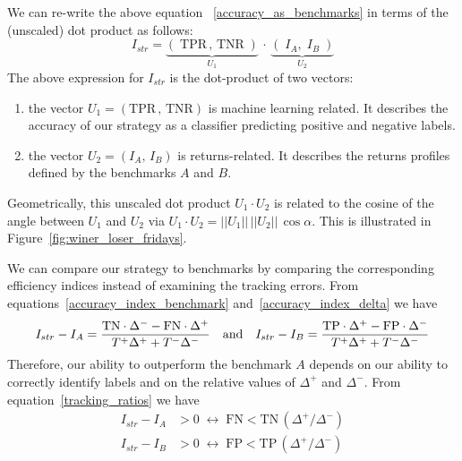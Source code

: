 \documentclass{article}
\begin{document}
We can re-write the above equation ~\eqref{accuracy_as_benchmarks} in terms of the (unscaled) dot product as 
follows:
\begin{equation}
I_{str} = \underbrace{(\; \text{TPR} \, , \, \text{TNR}\; )}_{U_{1}} \,  \cdot \, 
\underbrace{(\; I_{A},\;  I_{B}\; )}_{U_{2}}
\label{dot_product}
\end{equation}
The above expression for $I_{str}$ is the dot-product of two vectors:
\medskip
\begin{enumerate}[nosep] 
\item the vector $U_{1}=(\text{TPR}\, , \, \text{TNR})$ is machine learning related. It describes the accuracy of our strategy as a classifier predicting positive and negative labels.
\item the vector 
 $U_{2}=(I_{A},\,  I_{B})$ is returns-related. It 
 describes the returns profiles defined by the benchmarks $A$ and $B$.
 \end{enumerate}
 
Geometrically, this unscaled dot product $U_{1}\cdot U_{2}$ is related to the cosine of the angle between
$U_{1}$ and $U_{2}$ via 
$U_{1}\cdot U_{2}=\lvert\rvert U_{1}\lvert\rvert \, \lvert\rvert U_{2}\lvert\rvert\, \cos\alpha$. This is illustrated in Figure~\ref{fig:winer_loser_fridays}.

\medskip
We can compare our strategy to benchmarks by comparing the corresponding efficiency indices instead of examining the tracking errors.
From equations~\eqref{accuracy_index_benchmark} 
and~\eqref{accuracy_index_delta} we have
\begin{equation}
I_{str}-I_{A} = \frac{\text{TN}\cdot\Delta^{-}-\text{FN}\cdot\Delta^{+}}{T^{+} \Delta^{+} + T^{-}\Delta^{-}} \quad \hbox{and} \quad 
I_{str}-I_{B}  = \frac{\text{TP}\cdot\Delta^{+}-\text{FP}\cdot\Delta^{-}}{T^{+} \Delta^{+} + T^{-}\Delta^{-}} 
\label{tracking_ratios}
\end{equation}
Therefore, our ability to outperform the benchmark $A$  depends on our ability to correctly identify 
labels and on the relative values of $\Delta^{+}$ and $\Delta^{-}$. From equation~\eqref{tracking_ratios} we have
\begin{equation}
\begin{split}
I_{str}-I_{A} & > 0 \; \longleftrightarrow \; \text{FN}<\text{TN}\, (\Delta^{+}/\Delta^{-})\\
I_{str}-I_{B} & > 0 \; \longleftrightarrow \; \text{FP}<\text{TP}\, (\Delta^{+}/\Delta^{-})
\end{split}
\end{equation}
\end{document}

